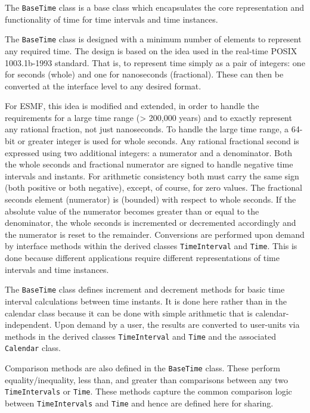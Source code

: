    The {\tt BaseTime} class is a base class which encapsulates the core
   representation and functionality of time for time intervals and time
   instances.
  
   The {\tt BaseTime} class is designed with a minimum number of elements
   to represent any required time.  The design is based on the idea used
   in the real-time POSIX 1003.1b-1993 standard.  That is, to represent
   time simply as a pair of integers: one for seconds (whole) and one for
   nanoseconds (fractional).  These can then be converted at the interface
   level to any desired format.
  
   For ESMF, this idea is modified and extended, in order to handle the
   requirements for a large time range (> 200,000 years) and to exactly
   represent any rational fraction, not just nanoseconds.  To handle the
   large time range, a 64-bit or greater integer is used for whole seconds.
   Any rational fractional second is expressed using two additional integers:
   a numerator and a denominator.  Both the whole seconds and fractional
   numerator are signed to handle negative time intervals and instants.
   For arithmetic consistency both must carry the same sign (both positive
   or both negative), except, of course, for zero values.  The fractional
   seconds element (numerator) is 
   (bounded) with respect to whole seconds. If the absolute value of the
   numerator becomes greater than or equal to the denominator, the whole
   seconds is incremented or decremented accordingly and the numerator is
   reset to the remainder.  Conversions are performed upon demand by
   interface methods within the derived classes {\tt TimeInterval} and
   {\tt Time}.  This is done because different applications require different
   representations of time intervals and time instances.
  
   The {\tt BaseTime} class defines increment and decrement methods for basic
   time interval calculations between time instants.  It is done here rather
   than in the calendar class because it can be done with simple arithmetic
   that is calendar-independent.  Upon demand by a user, the results are
   converted to user-units via methods in the derived classes {\tt TimeInterval}
   and {\tt Time} and the associated {\tt Calendar} class.
  
   Comparison methods are also defined in the {\tt BaseTime} class.  These
   perform equality/inequality, less than, and greater than comparisons
   between any two {\tt TimeIntervals} or {\tt Time}.  These methods capture
   the common comparison logic between {\tt TimeIntervals} and {\tt Time} and
   hence are defined here for sharing.
  
